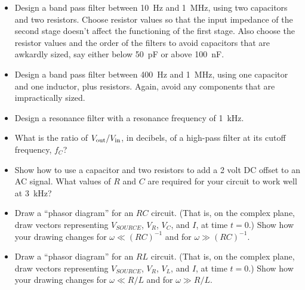 \begin{itemize}

\item Design a band pass filter between 10~Hz and 1~MHz, using two capacitors and two resistors.  Choose resistor values so that the input impedance of the second stage doesn't affect the functioning of the first stage.  Also choose the resistor values and the order of the filters to avoid capacitors that are awkardly sized, say either below 50~pF or above 100~nF.

\item Design a band pass filter between 400~Hz and 1~MHz, using one capacitor and one inductor, plus resistors.  Again, avoid any components that are impractically sized.

\item Design a resonance filter with a resonance frequency of 1~kHz. 

\item What is the ratio of $V_{\rm out}/V_{\rm in}$, in decibels, of a high-pass filter at its cutoff frequency, $f_C$?

\item Show how to use a capacitor and two resistors to add a 2 volt DC offset to an AC signal.  What values of $R$ and $C$ are required for your circuit to work well at 3~kHz?


\item Draw a ``phasor diagram'' for an $RC$ circuit.  (That is, on the complex plane, draw vectors representing $V_{SOURCE}$, $V_R$, $V_C$, and $I$, at time $t=0$.)  Show how your drawing changes for $\omega \ll (RC)^{-1}$ and for $\omega \gg (RC)^{-1}$.

\item Draw a ``phasor diagram'' for an $RL$ circuit.  (That is, on the complex plane, draw vectors representing $V_{SOURCE}$, $V_R$, $V_L$, and $I$, at time $t=0$.)  Show how your drawing changes for $\omega \ll R/L$ 
and for $\omega \gg R/L$.

\end{itemize}





